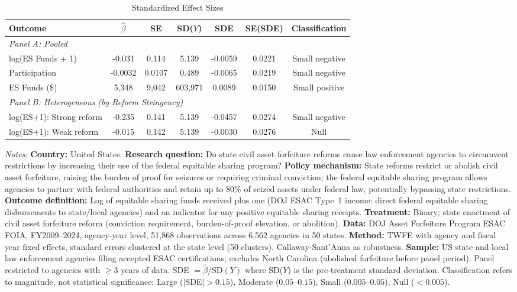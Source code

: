 \begin{table}[!htbp]
\centering
\begin{threeparttable}
\caption{Standardized Effect Sizes}
\label{tab:sde}
\begin{tabular}{@{}lcccccc@{}}
\toprule
Outcome & $\hat{\beta}$ & SE & SD($Y$) & SDE & SE(SDE) & Classification \\
\midrule
\multicolumn{7}{l}{\textit{Panel A: Pooled}} \\
log(ES Funds + 1) & -0.031 & 0.114 & 5.139 & -0.0059 & 0.0221 & Small negative \\
Participation & -0.0032 & 0.0107 & 0.489 & -0.0065 & 0.0219 & Small negative \\
ES Funds (\$) & 5,348 & 9,042 & 603,971 & 0.0089 & 0.0150 & Small positive \\
\midrule
\multicolumn{7}{l}{\textit{Panel B: Heterogeneous (by Reform Stringency)}} \\
log(ES+1): Strong reform & -0.235 & 0.141 & 5.139 & -0.0457 & 0.0274 & Small negative \\
log(ES+1): Weak reform & -0.015 & 0.142 & 5.139 & -0.0030 & 0.0276 & Null \\
\bottomrule
\end{tabular}
\begin{tablenotes}[flushleft]\small
\item \textit{Notes:} \textbf{Country:} United States. \textbf{Research question:} Do state civil asset forfeiture reforms cause law enforcement agencies to circumvent restrictions by increasing their use of the federal equitable sharing program? \textbf{Policy mechanism:} State reforms restrict or abolish civil asset forfeiture, raising the burden of proof for seizures or requiring criminal conviction; the federal equitable sharing program allows agencies to partner with federal authorities and retain up to 80\% of seized assets under federal law, potentially bypassing state restrictions. \textbf{Outcome definition:} Log of equitable sharing funds received plus one (DOJ ESAC Type~1 income: direct federal equitable sharing disbursements to state/local agencies) and an indicator for any positive equitable sharing receipts. \textbf{Treatment:} Binary; state enactment of civil asset forfeiture reform (conviction requirement, burden-of-proof elevation, or abolition). \textbf{Data:} DOJ Asset Forfeiture Program ESAC FOIA, FY2009--2024, agency-year level, 51,868 observations across 6,562 agencies in 50 states. \textbf{Method:} TWFE with agency and fiscal year fixed effects, standard errors clustered at the state level (50 clusters). Callaway-Sant'Anna as robustness. \textbf{Sample:} US state and local law enforcement agencies filing accepted ESAC certifications; excludes North Carolina (abolished forfeiture before panel period). Panel restricted to agencies with $\geq$3 years of data. SDE $= \hat{\beta} / \text{SD}(Y)$ where SD($Y$) is the pre-treatment standard deviation. Classification refers to magnitude, not statistical significance: Large ($|$SDE$| > 0.15$), Moderate ($0.05$--$0.15$), Small ($0.005$--$0.05$), Null ($< 0.005$).
\end{tablenotes}
\end{threeparttable}
\end{table}

